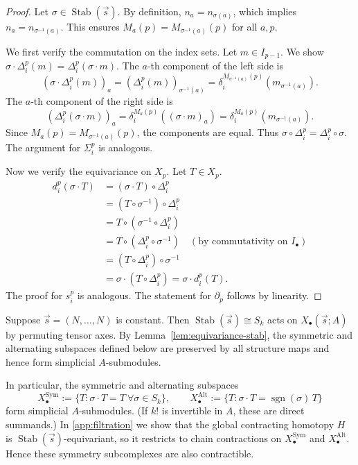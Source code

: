 \begin{proof}
Let $\sigma \in \operatorname{Stab}(\vec{s})$. By definition, $n_a = n_{\sigma(a)}$, which implies $n_a = n_{\sigma^{-1}(a)}$. This ensures $M_a(p) = M_{\sigma^{-1}(a)}(p)$ for all $a, p$.

We first verify the commutation on the index sets. Let $m \in I_{p-1}$. We show $\sigma \cdot \Delta_i^p(m) = \Delta_i^p(\sigma \cdot m)$. The $a$-th component of the left side is
\[
(\sigma \cdot \Delta_i^p(m))_a = (\Delta_i^p(m))_{\sigma^{-1}(a)} = \delta_i^{M_{\sigma^{-1}(a)}(p)}(m_{\sigma^{-1}(a)}).
\]
The $a$-th component of the right side is
\[
(\Delta_i^p(\sigma \cdot m))_a = \delta_i^{M_a(p)}((\sigma \cdot m)_a) = \delta_i^{M_a(p)}(m_{\sigma^{-1}(a)}).
\]
Since $M_a(p) = M_{\sigma^{-1}(a)}(p)$, the components are equal. Thus $\sigma \circ \Delta_i^p = \Delta_i^p \circ \sigma$. The argument for $\Sigma_i^p$ is analogous.

Now we verify the equivariance on $X_p$. Let $T \in X_p$.
\begin{align*}
d_i^p(\sigma\cdot T) &= (\sigma\cdot T) \circ \Delta_i^p \\
 &= (T \circ \sigma^{-1}) \circ \Delta_i^p \\
 &= T \circ (\sigma^{-1} \circ \Delta_i^p) \\
 &= T \circ (\Delta_i^p \circ \sigma^{-1}) \quad (\text{by commutativity on } I_\bullet)\\
 &= (T \circ \Delta_i^p) \circ \sigma^{-1} \\
 &= \sigma \cdot (T \circ \Delta_i^p) = \sigma \cdot d_i^p(T).
\end{align*}
The proof for $s_i^p$ is analogous. The statement for $\partial_p$ follows by linearity.
\end{proof}

\begin{remark}
Suppose $\vec s=(N,\dots,N)$ is constant. Then
$\operatorname{Stab}(\vec s)\cong S_k$ acts on $X_\bullet(\vec s;A)$ by
permuting tensor axes. By Lemma~\ref{lem:equivariance-stab}, the symmetric and alternating subspaces defined below are preserved by all structure maps and hence form simplicial $A$-submodules.

In particular, the symmetric and alternating subspaces
\[
X_\bullet^{\mathrm{Sym}}
 := \{T : \sigma\cdot T = T\ \forall\sigma\in S_k\},
 \qquad
X_\bullet^{\mathrm{Alt}}
 := \{T : \sigma\cdot T = \operatorname{sgn}(\sigma)\,T\}
\]
form simplicial $A$-submodules. (If $k!$ is invertible in $A$, these are direct summands.) In
\ref{app:filtration} we show that the global contracting homotopy
$H$ is $\operatorname{Stab}(\vec s)$-equivariant, so it restricts to
chain contractions on $X_\bullet^{\mathrm{Sym}}$ and $X_\bullet^{\mathrm{Alt}}$.
Hence these symmetry subcomplexes are also contractible.
\end{remark}

